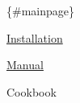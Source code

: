 \{\#mainpage\}


\begin{DoxyItemize}
\item \mbox{\hyperlink{_i_n_s_t_a_l_l_a_t_i_o_n_8md_source}{Installation}}
\item \mbox{\hyperlink{_m_a_n_u_a_l_8md_source}{Manual}}
\item Cookbook 
\end{DoxyItemize}